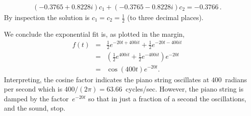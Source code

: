 \begin{example}
\begin{solution}
\begin{enumerate}
\begin{eqnarray*}
(-0.3765 + 0.8228i)c_1+(-0.3765 - 0.8228i)c_2=-0.3766\,.
\end{eqnarray*}
By inspection the solution is \(c_1=c_2=\tfrac12\) (to three decimal places).
\end{enumerate}
%
We conclude the exponential fit is, as plotted in the margin,
\begin{eqnarray*}
f(t)&=&\tfrac12e^{-20t+400it}+\tfrac12e^{-20t-400it}
\\&=&\left(\tfrac12e^{400it}+\tfrac12e^{-400it}\right)e^{-20t}
\\&=&\cos(400t)e^{-20t}.
\end{eqnarray*}
Interpreting, the cosine factor indicates the piano string oscillates at \(400\)~radians per second which is \(400/(2\pi)=63.66\)~cycles/sec.
%
However, the piano string is damped by the factor~\(e^{-20t}\) so that in just a fraction of a second the oscillations, and the sound, stop.
\end{solution}
\end{example}




